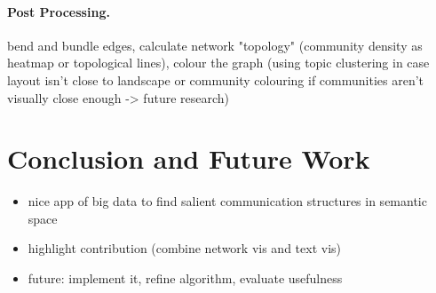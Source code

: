 \paragraph{Post Processing.}
bend and bundle edges, calculate network "topology" (community density as heatmap or topological lines), colour the graph (using topic clustering in case layout isn't close to landscape or community colouring if communities aren't visually close enough -> future research)

%

\section{Conclusion and Future Work}
\begin{itemize}
	\item nice app of big data to find salient communication structures in semantic space
	\item highlight contribution (combine network vis and text vis)
	\item future: implement it, refine algorithm, evaluate usefulness
\end{itemize}